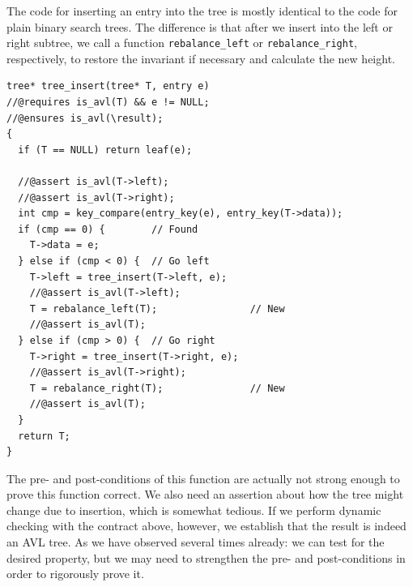 The code for inserting an entry into the tree is mostly identical
to the code for plain binary search trees.  The difference is that
after we insert into the left or right subtree, we call a function
\lstinline'rebalance_left' or \lstinline'rebalance_right', respectively, to
restore the invariant if necessary and calculate the new height.
\begin{lstlisting}[language={[C0]C}]
tree* tree_insert(tree* T, entry e)
//@requires is_avl(T) && e != NULL;
//@ensures is_avl(\result);
{
  if (T == NULL) return leaf(e);

  //@assert is_avl(T->left);
  //@assert is_avl(T->right);
  int cmp = key_compare(entry_key(e), entry_key(T->data));
  if (cmp == 0) {        // Found
    T->data = e;
  } else if (cmp < 0) {  // Go left
    T->left = tree_insert(T->left, e);
    //@assert is_avl(T->left);
    T = rebalance_left(T);                // New
    //@assert is_avl(T);
  } else if (cmp > 0) {  // Go right
    T->right = tree_insert(T->right, e);
    //@assert is_avl(T->right);
    T = rebalance_right(T);               // New
    //@assert is_avl(T);
  }
  return T;
}
\end{lstlisting}
The pre- and post-conditions of this function are actually not strong
enough to prove this function correct.  We also need an assertion
about how the tree might change due to insertion, which is somewhat
tedious.  If we perform dynamic checking with the contract above,
however, we establish that the result is indeed an AVL tree.  As we
have observed several times already: we can test for the desired
property, but we may need to strengthen the pre- and post-conditions
in order to rigorously prove it.

